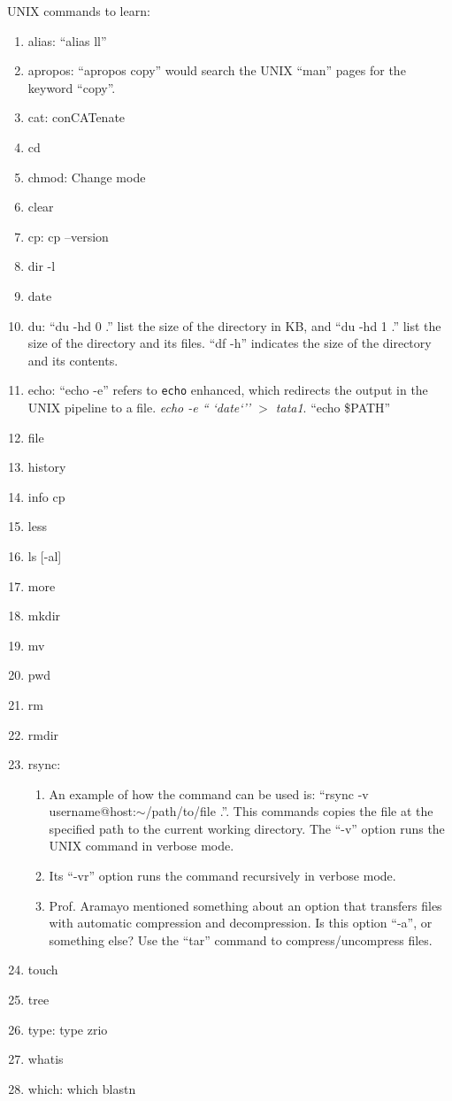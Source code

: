 UNIX commands to learn: \vspace{-0.3cm}
\begin{enumerate}	\itemsep -4pt
\item alias: ``alias ll''
\item apropos: ``apropos copy'' would search the UNIX ``man'' pages for the keyword ``copy''.
\item cat: conCATenate
\item cd
\item chmod: Change mode
\item clear
\item cp: cp --version
\item dir -l
\item date
\item du: ``du -hd 0 .'' list the size of the directory in KB, and ``du -hd 1 .'' list the size of the directory and its files. ``df -h'' indicates the size of the directory and its contents. 
\item echo: ``echo -e'' refers to {\tt echo} enhanced, which redirects the output in the UNIX pipeline to a file. {\it echo -e `` `date`'' $>$ tata1}. ``echo \$PATH''
\item file
\item history
\item info cp
\item less
\item ls [-al]
\item more
\item mkdir
\item mv
\item pwd
\item rm
\item rmdir
\item rsync: \vspace{-0.3cm}
	\begin{enumerate} \itemsep -2pt
	\item An example of how the command can be used is: ``rsync -v username@host:$\sim$/path/to/file .''. This commands copies the file at the specified path to the current working directory. The ``-v'' option runs the UNIX command in verbose mode.
	\item Its ``-vr'' option runs the command recursively in verbose mode.
	\item Prof. Aramayo mentioned something about an option that transfers files with automatic compression and decompression. Is this option ``-a'', or something else? Use the ``tar'' command to compress/uncompress files.
	\end{enumerate}
\item touch
\item tree
\item type: type zrio
\item whatis
\item which: which blastn
\end{enumerate}


